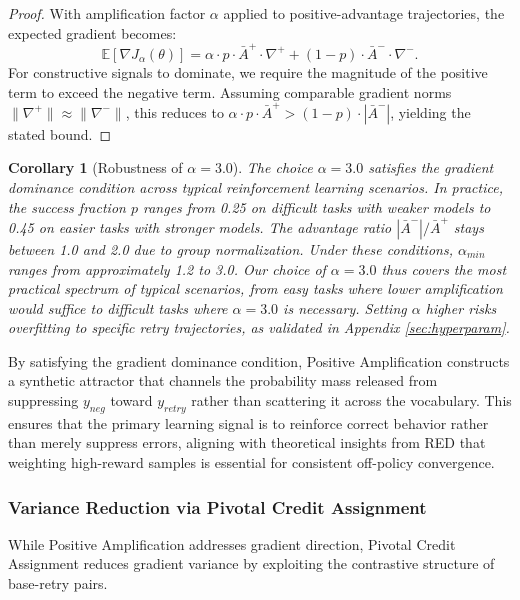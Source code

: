 \documentclass[11pt]{article}
\newtheorem{corollary}[theorem]{Corollary}
\theoremstyle{definition}
\theoremstyle{remark}
\begin{document}
\begin{proof}
With amplification factor $\alpha$ applied to positive-advantage trajectories, the expected gradient becomes:
\begin{equation}
\mathbb{E}[\nabla J_\alpha(\theta)] = \alpha \cdot p \cdot \bar{A}^+ \cdot \nabla^+ + (1-p) \cdot \bar{A}^- \cdot \nabla^-.
\end{equation}
For constructive signals to dominate, we require the magnitude of the positive term to exceed the negative term. Assuming comparable gradient norms $\|\nabla^+\| \approx \|\nabla^-\|$, this reduces to $\alpha \cdot p \cdot \bar{A}^+ > (1-p) \cdot |\bar{A}^-|$, yielding the stated bound.
\end{proof}

\begin{corollary}[Robustness of $\alpha = 3.0$]
The choice $\alpha = 3.0$ satisfies the gradient dominance condition across typical reinforcement learning scenarios. In practice, the success fraction $p$ ranges from 0.25 on difficult tasks with weaker models to 0.45 on easier tasks with stronger models. The advantage ratio $|\bar{A}^-|/\bar{A}^+$ stays between 1.0 and 2.0 due to group normalization. Under these conditions, $\alpha_{min}$ ranges from approximately 1.2 to 3.0. Our choice of $\alpha = 3.0$ thus covers the most practical spectrum of typical scenarios, from easy tasks where lower amplification would suffice to difficult tasks where $\alpha = 3.0$ is necessary. Setting $\alpha$ higher risks overfitting to specific retry trajectories, as validated in Appendix \ref{sec:hyperparam}.
\end{corollary}

By satisfying the gradient dominance condition, Positive Amplification constructs a synthetic attractor that channels the probability mass released from suppressing $y_{neg}$ toward $y_{retry}$ rather than scattering it across the vocabulary. This ensures that the primary learning signal is to reinforce correct behavior rather than merely suppress errors, aligning with theoretical insights from RED \cite{yao2025group} that weighting high-reward samples is essential for consistent off-policy convergence.

\subsubsection{Variance Reduction via Pivotal Credit Assignment}
\label{sec:analysis_pivot}

While Positive Amplification addresses gradient direction, Pivotal Credit Assignment reduces gradient variance by exploiting the contrastive structure of base-retry pairs.
\end{document}
